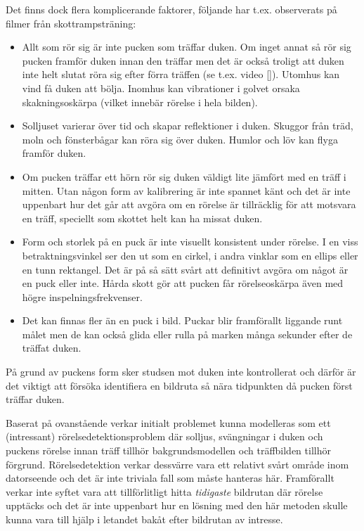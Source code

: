 \documentclass[a4paper,12pt]{article}
\begin{document}
Det finns dock flera komplicerande faktorer, följande har t.ex.
observerats på filmer från skottrampsträning:
\begin{itemize}
  \item Allt som rör sig är inte pucken som träffar duken. Om inget annat så
    rör sig pucken framför duken innan den träffar men det är också troligt
    att duken inte helt slutat röra sig efter förra träffen (se t.ex. video
    [\cite{Nockert:2018a}]). Utomhus kan vind få duken att bölja. Inomhus kan
    vibrationer i golvet orsaka skakningsoskärpa (vilket innebär rörelse i
    hela bilden).
  \item Solljuset varierar över tid och skapar reflektioner i duken. Skuggor
    från träd, moln och fönsterbågar kan röra sig över duken. Humlor och löv
    kan flyga framför duken.
  \item Om pucken träffar ett hörn rör sig duken väldigt lite jämfört med en
    träff i mitten. Utan någon form av kalibrering är inte spannet känt och
    det är inte uppenbart hur det går att avgöra om en rörelse är tillräcklig
    för att motsvara en träff, speciellt som skottet helt kan ha missat duken.
  \item Form och storlek på en puck är inte visuellt konsistent under rörelse.
    I en viss betraktningsvinkel ser den ut som en cirkel, i andra vinklar som
    en ellips eller en tunn rektangel. Det är på så sätt svårt att definitivt
    avgöra om något är en puck eller inte. Hårda skott gör att pucken får
    rörelseoskärpa även med högre inspelningsfrekvenser.
  \item Det kan finnas fler än en puck i bild. Puckar blir framförallt
    liggande runt målet men de kan också glida eller rulla på marken många
    sekunder efter de träffat duken.
\end{itemize}

På grund av puckens form sker studsen mot duken inte kontrollerat och därför
är det viktigt att försöka identifiera en bildruta så nära tidpunkten då
pucken först träffar duken.

Baserat på ovanstående verkar initialt problemet kunna modelleras som ett
(intressant) rörelsedetektionsproblem där solljus, svängningar i duken och
puckens rörelse innan träff tillhör bakgrundsmodellen och träffbilden tillhör
förgrund. Rörelsedetektion verkar dessvärre vara ett relativt svårt område
inom datorseende och det är inte triviala fall som måste hanteras här.
Framförallt verkar inte syftet vara att tillförlitligt hitta \textit{tidigaste}
bildrutan där rörelse upptäcks och det är inte uppenbart hur en lösning
med den här metoden skulle kunna vara till hjälp i letandet bakåt efter
bildrutan av intresse.
\end{document}
